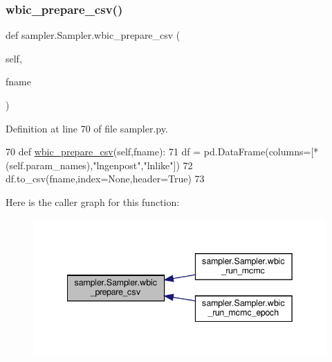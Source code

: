 \subsubsection{\texorpdfstring{wbic\+\_\+prepare\+\_\+csv()}{wbic\_prepare\_csv()}}
{\footnotesize\ttfamily def sampler.\+Sampler.\+wbic\+\_\+prepare\+\_\+csv (\begin{DoxyParamCaption}\item[{}]{self,  }\item[{}]{fname }\end{DoxyParamCaption})}



Definition at line 70 of file sampler.\+py.


\begin{DoxyCode}
70     \textcolor{keyword}{def }\hyperlink{classsampler_1_1Sampler_a92faf5125f59ded708dc71303d4938ac}{wbic\_prepare\_csv}(self,fname):
71         df = pd.DataFrame(columns=[*(self.param\_names),\textcolor{stringliteral}{"lngenpost"},\textcolor{stringliteral}{"lnlike"}])
72         df.to\_csv(fname,index=\textcolor{keywordtype}{None},header=\textcolor{keyword}{True})
73         
\end{DoxyCode}
Here is the caller graph for this function\+:\nopagebreak
\begin{figure}[H]
\begin{center}
\leavevmode
\includegraphics[width=342pt]{d3/d8a/classsampler_1_1Sampler_a92faf5125f59ded708dc71303d4938ac_icgraph}
\end{center}
\end{figure}
\mbox{\label{classsampler_1_1Sampler_aa26f751fdfe25f8b8fcc450d09ace641}} 
